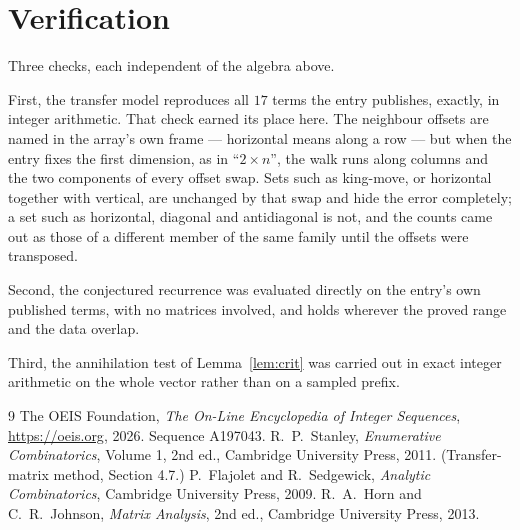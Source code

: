 \documentclass[11pt,a4paper]{article}
\theoremstyle{plain}
\theoremstyle{definition}
\begin{document}
\section{Verification}

Three checks, each independent of the algebra above.

First, the transfer model reproduces all $17$ terms the entry publishes, exactly, in
integer arithmetic. That check earned its place here. The neighbour offsets are named in the
array's own frame --- horizontal means along a row --- but when the entry fixes the first
dimension, as in ``$2\times n$'', the walk runs along columns and the two components of every
offset swap. Sets such as king-move, or horizontal together with vertical, are unchanged by
that swap and hide the error completely; a set such as horizontal, diagonal and antidiagonal
is not, and the counts came out as those of a different member of the same family until the
offsets were transposed.

Second, the conjectured recurrence was evaluated directly on the entry's own published terms,
with no matrices involved, and holds wherever the proved range and the data overlap.

Third, the annihilation test of Lemma~\ref{lem:crit} was carried out in exact integer
arithmetic on the whole vector rather than on a sampled prefix.

\begin{thebibliography}{9}
 The OEIS Foundation, \emph{The On-Line Encyclopedia of Integer
Sequences}, \url{https://oeis.org}, 2026. Sequence A197043.
 R.~P.~Stanley, \emph{Enumerative Combinatorics}, Volume 1, 2nd ed.,
Cambridge University Press, 2011. (Transfer-matrix method, Section 4.7.)
 P.~Flajolet and R.~Sedgewick, \emph{Analytic Combinatorics}, Cambridge
University Press, 2009.
 R.~A.~Horn and C.~R.~Johnson, \emph{Matrix Analysis}, 2nd ed., Cambridge
University Press, 2013.
\end{thebibliography}
\end{document}
